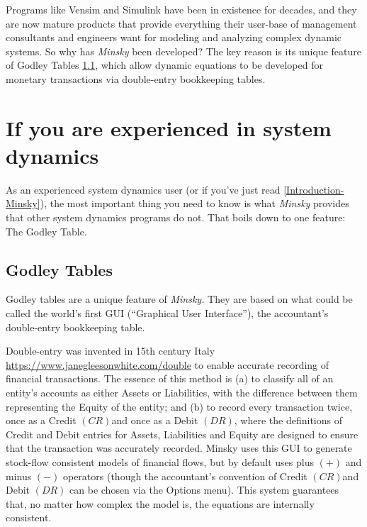 Programs like Vensim and Simulink have been in existence for decades,
and they are now mature products that provide everything their user-base
of management consultants and engineers want for modeling and analyzing
complex dynamic systems. So why has \emph{Minsky} been developed?
The key reason is its unique feature of Godley Tables \ref{Godley-Tables},
which allow dynamic equations to be developed for monetary transactions
via double-entry bookkeeping tables.

\section{If you are experienced in system dynamics}

\label{intro:experienced-system-dynamics}

As an experienced system dynamics user (or if you've just read \ref{Introduction-Minsky}),
the most important thing you need to know is what \emph{Minsky} provides
that other system dynamics programs do not. That boils down to one
feature: The Godley Table. 

\subsection{Godley Tables}

\label{Godley-Tables}

Godley tables are a unique feature of \emph{Minsky.} They are based
on what could be called the world's first GUI (``Graphical User Interface''),
the accountant's double-entry bookkeeping table.

Double-entry was invented in 15th century Italy \url{https://www.janegleesonwhite.com/double}
to enable accurate recording of financial transactions. The essence
of this method is (a) to classify all of an entity's accounts as either
Assets or Liabilities, with the difference between them representing
the Equity of the entity; and (b) to record every transaction twice,
once as a Credit $\left(CR\right)$and once as a Debit $\left(DR\right)$,
where the definitions of Credit and Debit entries for Assets, Liabilities
and Equity are designed to ensure that the transaction was accurately
recorded. Minsky uses this GUI to generate stock-flow consistent models
of financial flows, but by default uses plus $\left(+\right)$ and
minus $\left(-\right)$ operators (though the accountant's convention
of Credit $\left(CR\right)$and Debit $\left(DR\right)$ can be chosen
via the Options menu). This system guarantees that, no matter how
complex the model is, the equations are internally consistent.

